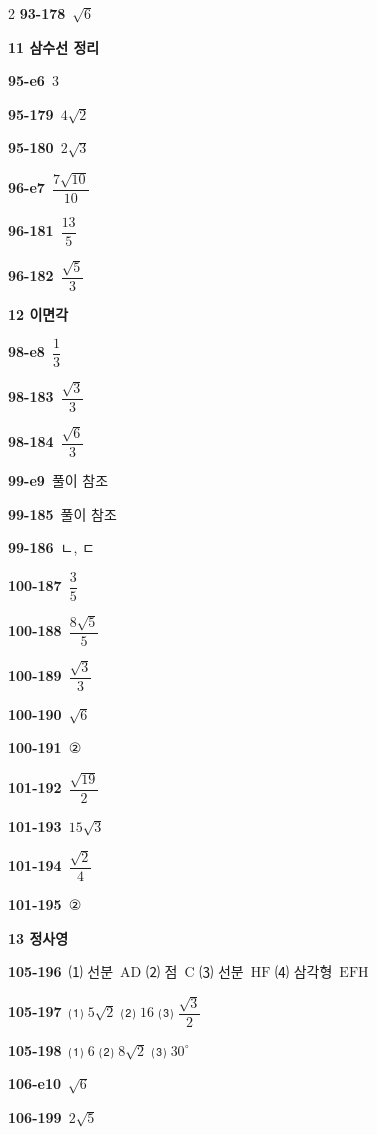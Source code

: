 \documentclass[10pt,a4paper]{article}
\newcommand{\pt}[1]{\mathrm{#1}}
\begin{document}
\begin{multicols}{2}
\noindent\textbf{93-178}\ $\sqrt{6}$\par
\noindent\textbf{11 삼수선 정리}\par\smallskip
\noindent\textbf{95-e6}\ $3$\par
\noindent\textbf{95-179}\ $4\sqrt{2}$\par
\noindent\textbf{95-180}\ $2\sqrt{3}$\par
\noindent\textbf{96-e7}\ $\dfrac{7\sqrt{10}}{10}$\par
\noindent\textbf{96-181}\ $\dfrac{13}{5}$\par
\noindent\textbf{96-182}\ $\dfrac{\sqrt{5}}{3}$\par
\noindent\textbf{12 이면각}\par\smallskip
\noindent\textbf{98-e8}\ $\dfrac{1}{3}$\par
\noindent\textbf{98-183}\ $\dfrac{\sqrt{3}}{3}$\par
\noindent\textbf{98-184}\ $\dfrac{\sqrt{6}}{3}$\par
\noindent\textbf{99-e9}\ 풀이 참조\par
\noindent\textbf{99-185}\ 풀이 참조\par
\noindent\textbf{99-186}\ ㄴ, ㄷ\par
\noindent\textbf{100-187}\ $\dfrac{3}{5}$\par
\noindent\textbf{100-188}\ $\dfrac{8\sqrt{5}}{5}$\par
\noindent\textbf{100-189}\ $\dfrac{\sqrt{3}}{3}$\par
\noindent\textbf{100-190}\ $\sqrt{6}$\par
\noindent\textbf{100-191}\ ②\par
\noindent\textbf{101-192}\ $\dfrac{\sqrt{19}}{2}$\par
\noindent\textbf{101-193}\ $15\sqrt{3}$\par
\noindent\textbf{101-194}\ $\dfrac{\sqrt{2}}{4}$\par
\noindent\textbf{101-195}\ ②\par
\noindent\textbf{13 정사영}\par\smallskip
\noindent\textbf{105-196}\ ⑴ 선분~$\pt{AD}$ ⑵ 점~$\pt{C}$ ⑶ 선분~$\pt{HF}$ ⑷ 삼각형~$\pt{EFH}$\par
\noindent\textbf{105-197}\ ⑴ $5\sqrt{2}$ ⑵ $16$ ⑶ $\dfrac{\sqrt{3}}{2}$\par
\noindent\textbf{105-198}\ ⑴ $6$ ⑵ $8\sqrt{2}$ ⑶ $30^\circ$\par
\noindent\textbf{106-e10}\ $\sqrt{6}$\par
\noindent\textbf{106-199}\ $2\sqrt{5}$\par

\end{multicols}
\end{document}
